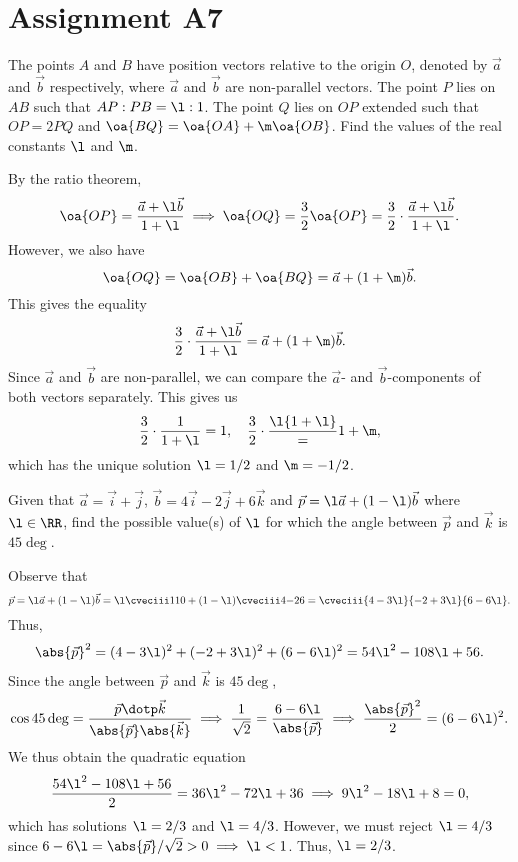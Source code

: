 \section{Assignment A7}

\begin{problem}
    The points $A$ and $B$ have position vectors relative to the origin $O$, denoted by $\vec a$ and $\vec b$ respectively, where $\vec a$ and $\vec b$ are non-parallel vectors. The point $P$ lies on $AB$ such that $AP : PB = \l : 1$. The point $Q$ lies on $OP$ extended such that $OP = 2PQ$ and $\oa{BQ} = \oa{OA} + \m \oa{OB}$. Find the values of the real constants $\l$ and $\m$.
\end{problem}
\begin{solution}
    By the ratio theorem, \[\oa{OP} = \frac{\vec a + \l \vec b}{1 + \l} \implies \oa{OQ} = \frac32 \oa{OP} = \frac32 \cdot \frac{\vec a + \l \vec b}{1 + \l}.\] However, we also have \[\oa{OQ} = \oa{OB} + \oa{BQ} = \vec a + (1 + \m) \vec b.\] This gives the equality \[\frac32 \cdot \frac{\vec a + \l \vec b}{1 + \l} = \vec a + (1 + \m) \vec b.\] Since $\vec a$ and $\vec b$ are non-parallel, we can compare the $\vec a$- and $\vec b$-components of both vectors separately. This gives us \[\frac32 \cdot \frac1{1 + \l} = 1, \quad \frac32 \cdot \frac\l{1 + \l} = 1 + \m,\] which has the unique solution $\l = 1/2$ and $\m = -1/2$.
\end{solution}

\begin{problem}
    Given that $\vec a = \vec i + \vec j$, $\vec b = 4 \vec i - 2 \vec j + 6 \vec k$ and $\vec p = \l \vec a + (1 - \l) \vec b$ where $\l \in \RR$, find the possible value(s) of $\l$ for which the angle between $\vec p$ and $\vec k$ is $45\deg$.
\end{problem}
\begin{solution}
    Observe that \[\vec p = \l \vec a + (1 - \l)\vec b = \l \cveciii110 + (1 - \l)\cveciii4{-2}6 = \cveciii{4 - 3 \l}{-2 + 3\l}{6 - 6\l}.\] Thus, \[\abs{\vec p}^2 = (4 - 3\l)^2 + (-2 + 3\l)^2 + (6 - 6\l)^2 = 54\l^2 - 108\l + 56.\] Since the angle between $\vec p$ and $\vec k$ is $45\deg$, \[\cos 45\deg = \frac{\vec p \dotp \vec k}{\abs{\vec p} \abs{\vec k}} \implies \frac1{\sqrt2} = \frac{6 - 6\l}{\abs{\vec p}} \implies \frac{\abs{\vec p}^2}{2} = (6 - 6\l)^2.\] We thus obtain the quadratic equation \[\frac{54\l^2 - 108\l + 56}2 = 36\l^2 - 72\l + 36 \implies 9\l^2 - 18\l + 8 = 0,\] which has solutions $\l = 2/3$ and $\l = 4/3$. However, we must reject $\l = 4/3$ since $6 - 6\l = \abs{\vec p}/\sqrt{2} > 0 \implies \l < 1$. Thus, $\l = 2/3$.
\end{solution}

